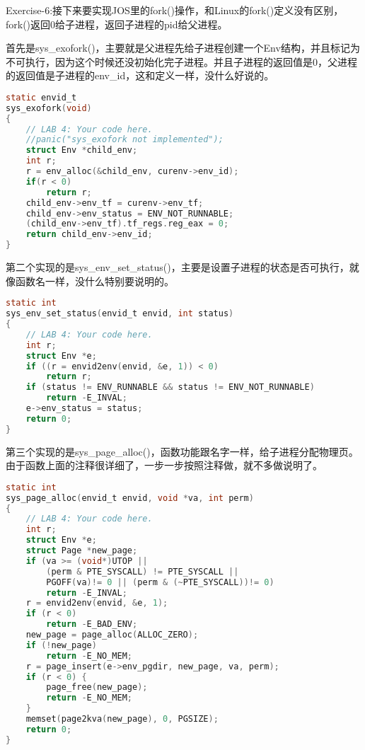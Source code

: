 \documentclass[11pt,a4paper]{article}
\begin{document}
\color{red}Exercise-6:\color{black}接下来要实现JOS里的fork()操作，和Linux的fork()定义没有区别，fork()返回0给子进程，返回子进程的pid给父进程。

首先是sys\_exofork()，主要就是父进程先给子进程创建一个Env结构，并且标记为不可执行，因为这个时候还没初始化完子进程。并且子进程的返回值是0，父进程的返回值是子进程的env\_id，这和定义一样，没什么好说的。

\setmainfont{Consolas}
\begin{lstlisting}[language={C},firstnumber=1,title=kern/syscall.c] 
static envid_t
sys_exofork(void)
{
	// LAB 4: Your code here.
	//panic("sys_exofork not implemented");
	struct Env *child_env;
	int r;
	r = env_alloc(&child_env, curenv->env_id);
	if(r < 0)
		return r;
	child_env->env_tf = curenv->env_tf;
	child_env->env_status = ENV_NOT_RUNNABLE;
	(child_env->env_tf).tf_regs.reg_eax = 0;
	return child_env->env_id;
}
\end{lstlisting}
\setmainfont[BoldFont=黑体]{宋体}

第二个实现的是sys\_env\_set\_status()，主要是设置子进程的状态是否可执行，就像函数名一样，没什么特别要说明的。

\setmainfont{Consolas}
\begin{lstlisting}[language={C},firstnumber=1,title=kern/syscall.c] 
static int
sys_env_set_status(envid_t envid, int status)
{
	// LAB 4: Your code here.
	int r;
	struct Env *e;
	if ((r = envid2env(envid, &e, 1)) < 0)
		return r;
	if (status != ENV_RUNNABLE && status != ENV_NOT_RUNNABLE)
		return -E_INVAL;
	e->env_status = status;
	return 0;
}
\end{lstlisting}
\setmainfont[BoldFont=黑体]{宋体}

第三个实现的是sys\_page\_alloc()，函数功能跟名字一样，给子进程分配物理页。由于函数上面的注释很详细了，一步一步按照注释做，就不多做说明了。

\setmainfont{Consolas}
\begin{lstlisting}[language={C},firstnumber=1,title=kern/syscall.c] 
static int
sys_page_alloc(envid_t envid, void *va, int perm)
{
	// LAB 4: Your code here.
	int r;
	struct Env *e;
	struct Page *new_page;
	if (va >= (void*)UTOP || 
	    (perm & PTE_SYSCALL) != PTE_SYSCALL || 
	    PGOFF(va)!= 0 || (perm & (~PTE_SYSCALL))!= 0)
		return -E_INVAL;
	r = envid2env(envid, &e, 1);
	if (r < 0)
		return -E_BAD_ENV;
	new_page = page_alloc(ALLOC_ZERO);
	if (!new_page)
		return -E_NO_MEM;
	r = page_insert(e->env_pgdir, new_page, va, perm);
	if (r < 0) {
		page_free(new_page);
		return -E_NO_MEM;
	}
	memset(page2kva(new_page), 0, PGSIZE);  
	return 0;
}
\end{lstlisting}
\setmainfont[BoldFont=黑体]{宋体}
\end{document}
